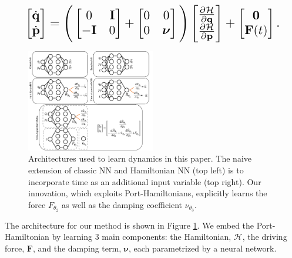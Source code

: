 \documentclass{article}
\begin{document}
\begin{equation}
\resizebox{0.9\linewidth}{!}{$%
\begin{bmatrix}
\dot{\mathbf{q}} \\
\dot{\mathbf{p}}
\end{bmatrix}
=
\Bigg(\begin{bmatrix}
0 & \mathbf{I} \\
-\mathbf{I} & 0
\end{bmatrix} +
\begin{bmatrix}
0 & 0 \\
0 & \boldsymbol\nu
\end{bmatrix}
 \Bigg)
 \begin{bmatrix}
\frac{\partial \mathcal{H}}{\partial \mathbf{q}} \\
\frac{\partial \mathcal{H}}{\partial \mathbf{p}}
\end{bmatrix}
+
\begin{bmatrix}
\mathbf{0} \\
\mathbf{F}(t)
\end{bmatrix}.
$%
}%
\label{eqn.pham1}
\end{equation}
\begin{figure}[h!]
\centering
\includegraphics[width=0.5\textwidth]{figures/architecture1.pdf}
\caption{Architectures used to learn dynamics in this paper. The naive extension of classic NN and Hamiltonian NN (top left) is to incorporate time as an additional input variable (top right). Our innovation, which exploits Port-Hamiltonians, explicitly learns the force $F_{\theta_2}$ as well as the damping coefficient $\nu_{\theta_3}$.}
\label{fig.architecture}
\end{figure}

The architecture for our method is shown in Figure \ref{fig.architecture}. We embed the Port-Hamiltonian by learning 3 main components: the Hamiltonian, $\mathcal{H}$, the driving force, $\mathbf{F}$, and the damping term, $\boldsymbol\nu$, each parametrized by a neural network.
\end{document}
